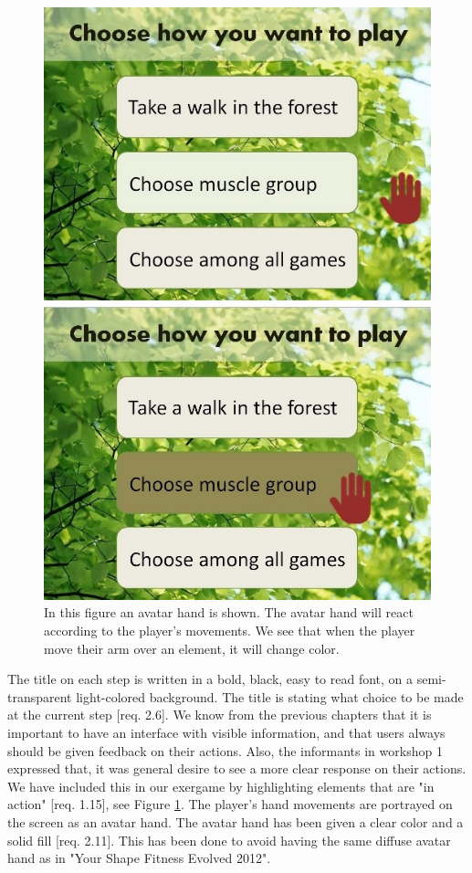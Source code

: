 \begin{figure} [H]
\centering
\includegraphics[scale=0.5]{menuAction.jpg}
\caption[Menu - Action and response]{In this figure an avatar hand is shown. The avatar hand will react according to the player's movements. We see that when the player move their arm over an element, it will change color.}
\label{fig:avatarAction}
\end{figure} 

The title on each step is written in a bold, black, easy to read font, on a semi-transparent light-colored background. The title is stating what choice to be made at the current step [req. 2.6]. We know from the previous chapters that it is important to have an interface with visible information, and that users always should be given feedback on their actions. Also, the informants in workshop 1 expressed that, it was general desire to see a more clear response on their actions. We have included this in our exergame by highlighting elements that are "in action" [req. 1.15], see Figure \ref{fig:avatarAction}. The player's hand movements are portrayed on the screen as an avatar hand. The avatar hand has been given a clear color and a solid fill [req. 2.11]. This has been done to avoid having the same diffuse avatar hand as in "Your Shape Fitness Evolved 2012".  

